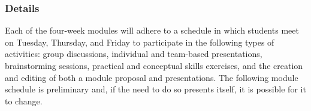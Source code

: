 \subsubsection*{Details}

Each of the four-week modules will adhere to a schedule in which students meet on Tuesday, Thursday, and Friday to
participate in the following types of activities: group discussions, individual and team-based presentations,
brainstorming sessions, practical and conceptual skills exercises, and the creation and editing of both a module
proposal and presentations.  The following module schedule is preliminary and, if the need to do so presents itself, it
is possible for it to change.


\vspace*{.2in}
\hspace*{-.75in}
